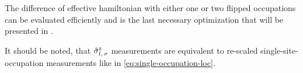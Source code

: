 The difference of effective hamiltonian with either one or two flipped occupations can be evaluated efficiently and is the last necessary optimization that will be presented in .

It should be noted, that $\pauli[l,\,\sigma]{z}$ measurements are equivalent to re-scaled single-site-occupation measurements like in \autoref{eq:single-occupation-loc}.
